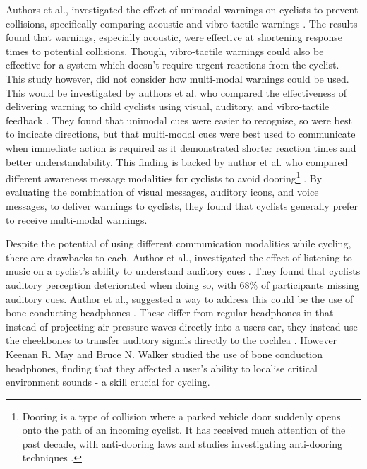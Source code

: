 \documentclass{interim}
\begin{document}
Authors et al., investigated the effect of unimodal warnings on cyclists to prevent collisions, specifically comparing acoustic and vibro-tactile warnings \cite{STROHAEKER2022151}. The results found that warnings, especially acoustic, were effective at shortening response times to potential collisions. Though, vibro-tactile warnings could also be effective for a system which doesn’t require urgent reactions from the cyclist. This study however, did not consider how multi-modal warnings could be used. This would be investigated by authors et al. who compared the effectiveness of delivering warning to child cyclists using visual, auditory, and vibro-tactile feedback \cite{10.1145/3290605.3300850, 10.1145/3229434.3229479}. They found that unimodal cues were easier to recognise, so were best to indicate directions, but that multi-modal cues were best used to communicate when immediate action is required as it demonstrated shorter reaction times and better understandability. This finding is backed by author et al. who compared different awareness message modalities for cyclists to avoid dooring\footnote{Dooring is a type of collision where a parked vehicle door suddenly opens onto the path of an incoming cyclist. It has received much attention of the past decade, with anti-dooring laws \cite{roadsafetyrules, highwaycode, illinoiscode} and studies investigating anti-dooring techniques \cite{large2018validating}.} \cite{10.1145/3490099.3511127, mti6010003}. By evaluating the combination of visual messages, auditory icons, and voice messages, to deliver warnings to cyclists, they found that cyclists generally prefer to receive multi-modal warnings.

Despite the potential of using different communication modalities while cycling, there are drawbacks to each. Author et al., investigated the effect of listening to music on a cyclist’s ability to understand auditory cues \cite{DEWAARD2011626}. They found that cyclists auditory perception deteriorated when doing so, with 68\% of participants missing auditory cues. Author et al., suggested a way to address this could be the use of bone conducting headphones \cite{wolfe2016distracted}. These differ from regular headphones in that instead of projecting air pressure waves directly into a users ear, they instead use the cheekbones to transfer auditory signals directly to the cochlea \cite{littler1952hearing}. However Keenan R. May and Bruce N. Walker studied the use of bone conduction headphones, finding that they affected a user’s ability to localise critical environment sounds \cite{may2017effects} - a skill crucial for cycling.
\end{document}
